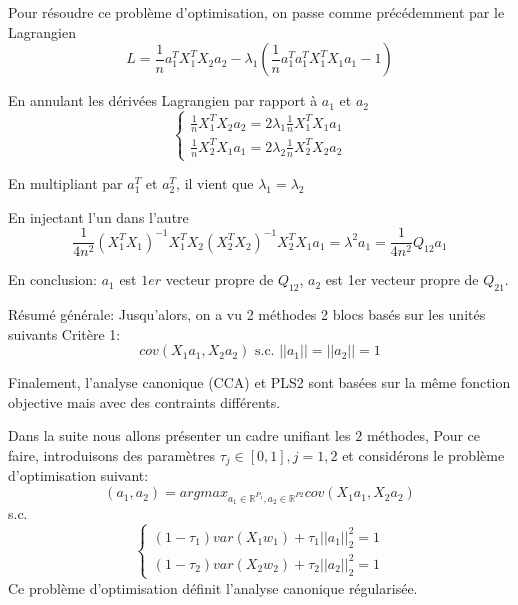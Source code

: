 \documentclass{article}
\begin{document}
Pour r\'esoudre ce probl\`eme d'optimisation, on passe comme pr\'ec\'edemment par le Lagrangien
\begin{equation}
L=\frac{1}{n}a_1^TX_1^TX_2a_2-\lambda_1(\frac{1}{n}a_1^Ta_1^TX_1^TX_1a_1-1)
\end{equation}

En annulant les d\'eriv\'ees Lagrangien par rapport \`a $a_1$ et $a_2$
\begin{equation}
\left\{\begin{array}{ll}
\frac{1}{n}X_1^TX_2a_2=2\lambda_1\frac{1}{n}X_1^TX_1a_1\\
\frac{1}{n}X_2^TX_1a_1=2\lambda_2\frac{1}{n}X_2^TX_2a_2
\end{array}\right.
\end{equation}

En multipliant par $a_1^T$ et $a_2^T$, il vient que $\lambda_1=\lambda_2$

En injectant l'un dans l'autre
\begin{equation}
\frac{1}{4n^2}(X_1^TX_1)^{-1}X_1^TX_2(X_2^TX_2)^{-1}X_2^TX_1a_1=\lambda^2a_1=\frac{1}{4n^2}Q_{12}a_1
\end{equation}

En conclusion:
$a_1$ est $1er$ vecteur propre de $Q_{12}$, $a_2$ est 1er vecteur propre de $Q_{21}$.

R\'esum\'e g\'en\'erale: Jusqu'alors, on a vu 2 m\'ethodes 2 blocs bas\'es sur les unit\'es suivants
Crit\`ere 1:
\begin{equation}
cov(X_1a_1, X_2a_2) \text{ s.c. }||a_1||=||a_2||=1
\end{equation}

Finalement, l'analyse canonique (CCA) et PLS2 sont bas\'ees sur la m\^eme fonction objective mais avec des contraints diff\'erents.

Dans la suite nous allons pr\'esenter un cadre unifiant les $2$ m\'ethodes, Pour ce faire, introduisons des param\`etres $\tau_j\in[0,1],j=1,2$ et consid\'erons le probl\`eme d'optimisation suivant:
\begin{equation}
(a_1,a_2)=argmax_{a_1\in\mathbb{R}^{P_1},a_2\in\mathbb{R}^{P2}} cov(X_1a_1,X_2a_2)
\end{equation}
s.c.
\begin{equation}
\left\{\begin{array}{ll}
(1-\tau_1)var(X_1w_1)+\tau_1||a_1||_2^2=1\\
(1-\tau_2)var(X_2w_2)+\tau_2||a_2||_2^2=1
\end{array}\right.
\end{equation}
Ce probl\`eme d'optimisation d\'efinit l'analyse canonique r\'egularis\'ee.
\end{document}

